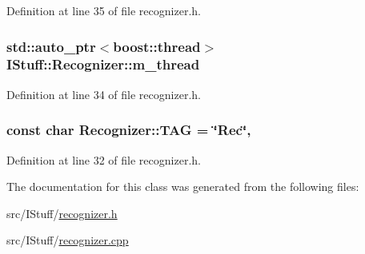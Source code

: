 Definition at line 35 of file recognizer.\-h.

\hypertarget{class_i_stuff_1_1_recognizer_a54706a2dbb34a1532fcf4445ef3db5ae}{
\subsubsection[{m\-\_\-thread}]{\setlength{\rightskip}{0pt plus 5cm}std\-::auto\-\_\-ptr$<$boost\-::thread$>$ I\-Stuff\-::\-Recognizer\-::m\-\_\-thread\hspace{0.3cm}{\ttfamily [private]}}}\label{class_i_stuff_1_1_recognizer_a54706a2dbb34a1532fcf4445ef3db5ae}


Definition at line 34 of file recognizer.\-h.

\hypertarget{class_i_stuff_1_1_recognizer_a90ec5deceaef320be5e825f653dcf7f1}{
\subsubsection[{T\-A\-G}]{\setlength{\rightskip}{0pt plus 5cm}const char Recognizer\-::\-T\-A\-G = \char`\"{}Rec\char`\"{}\hspace{0.3cm}{\ttfamily [static]}, {\ttfamily [private]}}}\label{class_i_stuff_1_1_recognizer_a90ec5deceaef320be5e825f653dcf7f1}


Definition at line 32 of file recognizer.\-h.



The documentation for this class was generated from the following files\-:\begin{DoxyCompactItemize}
\item 
src/\-I\-Stuff/\hyperlink{recognizer_8h}{recognizer.\-h}\item 
src/\-I\-Stuff/\hyperlink{recognizer_8cpp}{recognizer.\-cpp}\end{DoxyCompactItemize}
